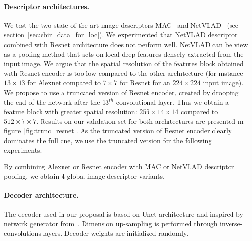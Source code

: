 \paragraph{Descriptor architectures.}

We test the two state-of-the-art image descriptors MAC~\citep{Razavian2014a} and NetVLAD~\citep{Arandjelovic2017} (see section~\ref{sec:cbir_data_for_loc}). We experimented that NetVLAD descriptor combined with Resnet architecture does not perform well. NetVLAD can be view as a pooling method that acts on local deep features densely extracted from the input image. We argue that the spatial resolution of the features block obtained with Resnet encoder is too low compared to the other architecture (for instance $13\times13$ for Alexnet compared to $7\times7$ for Resnet for an $224\times224$ input image). We propose to use a truncated version of Resnet encoder, created by drooping the end of the network after the 13$^{th}$ convolutional layer. Thus we obtain a feature block with greater spatial resolution: $256\times14\times14$ compared to $512\times7\times7$. Results on our validation set for both architectures are presented in figure~\ref{fig:trunc_resnet}. As the truncated version of Resnet encoder clearly dominates the full one, we use the truncated version for the following experiments.

By combining Alexnet or Resnet encoder with MAC or NetVLAD descriptor pooling, we obtain 4 global image descriptor variants.

\paragraph{Decoder architecture.}
The decoder used in our proposal is based on Unet architecture and inspired by network generator from~\cite{Isola2017}. Dimension up-sampling is performed through inverse-convolutions layers. Decoder weights are initialized randomly.

